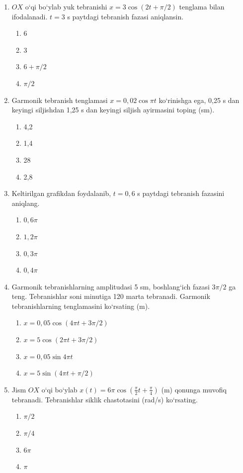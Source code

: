 \begin{enumerate}
\item $OX$ o‘qi bo‘ylab yuk tebranishi $x = 3 \cos(2t + \pi/2)$ tenglama bilan ifodalanadi. $t = 3$ s paytdagi tebranish fazasi aniqlansin.
\begin{enumerate}[label=\Alph*)]
\item 6
\item 3
\item $6 + \pi/2$
\item $\pi/2$
\end{enumerate}

\item Garmonik tebranish tenglamasi $x = 0,02 \cos \pi t$ ko‘rinishga ega, 0,25 s dan keyingi siljishdan 1,25 s dan keyingi siljish ayirmasini toping (sm).
\begin{enumerate}[label=\Alph*)]
\item 4,2
\item 1,4
\item 28
\item 2,8
\end{enumerate}

\item Keltirilgan grafikdan foydalanib, $t = 0,6$ s paytdagi tebranish fazasini aniqlang.
\begin{enumerate}[label=\Alph*)]
\item $0,6\pi$
\item $1,2\pi$
\item $0,3\pi$
\item $0,4\pi$
\end{enumerate}

\item Garmonik tebranishlarning amplitudasi 5 sm, boshlang‘ich fazasi $3\pi/2$ ga teng. Tebranishlar soni minutiga 120 marta tebranadi. Garmonik tebranishlarning tenglamasini ko‘rsating (m).
\begin{enumerate}[label=\Alph*)]
\item $x = 0,05 \cos(4\pi t + 3\pi/2)$
\item $x = 5 \cos(2\pi t + 3\pi/2)$
\item $x = 0,05 \sin 4\pi t$
\item $x = 5 \sin(4\pi t + \pi/2)$
\end{enumerate}

\item Jism $OX$ o‘qi bo‘ylab $x(t) = 6\pi \cos(\frac{\pi}{2}t + \frac{\pi}{4})$ (m) qonunga muvofiq tebranadi. Tebranishlar siklik chastotasini (rad/s) ko‘rsating.
\begin{enumerate}[label=\Alph*)]
\item $\pi/2$
\item $\pi/4$
\item $6\pi$
\item $\pi$
\end{enumerate}


\end{enumerate}
